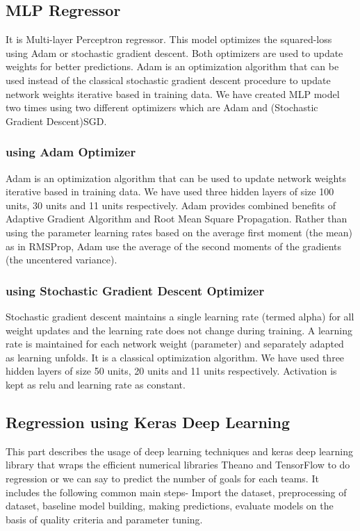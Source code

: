 \subsection{MLP Regressor}
It is Multi-layer Perceptron regressor. This model optimizes the squared-loss using Adam or stochastic gradient descent. Both optimizers are used to update weights for better predictions. Adam is an optimization algorithm that can be used instead of the classical stochastic gradient descent procedure to update network weights iterative based in training data. We have created MLP model two times using two different optimizers which are Adam and (Stochastic Gradient Descent)SGD.\newline
\subsubsection{using Adam Optimizer }
Adam is an optimization algorithm that can be used to update network weights iterative based in training data. We have used three hidden layers of size 100 units, 30 units and 11 units respectively. Adam provides combined benefits of Adaptive Gradient Algorithm and Root Mean Square Propagation. Rather than using the parameter learning rates based on the average first moment (the mean) as in RMSProp, Adam use the average of the second moments of the gradients (the uncentered variance).\newline
\subsubsection{using Stochastic Gradient Descent Optimizer }
Stochastic gradient descent maintains a single learning rate (termed alpha) for all weight updates and the learning rate does not change during training. A learning rate is maintained for each network weight (parameter) and separately adapted as learning unfolds. It is a classical optimization algorithm. We have used three hidden layers of size 50 units, 20 units and 11 units respectively. Activation is kept as relu and learning rate as constant.\newline
\subsection{Regression using Keras Deep Learning }
This part describes the usage of deep learning techniques and keras deep learning library that wraps the efficient numerical libraries Theano and TensorFlow to do regression or we can say to predict the number of goals for each teams. It includes the following common main steps- Import the dataset, preprocessing of dataset, baseline model building, making predictions, evaluate models on the basis of quality criteria and parameter tuning. %
